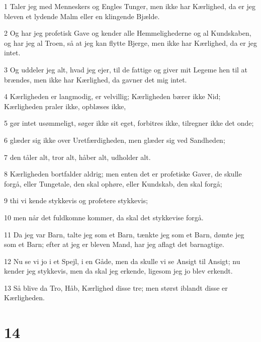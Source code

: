 \par 1 Taler jeg med Menneskers og Engles Tunger, men ikke har Kærlighed, da er jeg bleven et lydende Malm eller en klingende Bjælde.
\par 2 Og har jeg profetisk Gave og kender alle Hemmelighederne og al Kundskaben, og har jeg al Troen, så at jeg kan flytte Bjerge, men ikke har Kærlighed, da er jeg intet.
\par 3 Og uddeler jeg alt, hvad jeg ejer, til de fattige og giver mit Legeme hen til at brændes, men ikke har Kærlighed, da gavner det mig intet.
\par 4 Kærligheden er langmodig, er velvillig; Kærligheden bærer ikke Nid; Kærligheden praler ikke, opblæses ikke,
\par 5 gør intet usømmeligt, søger ikke sit eget, forbitres ikke, tilregner ikke det onde;
\par 6 glæder sig ikke over Uretfærdigheden, men glæder sig ved Sandheden;
\par 7 den tåler alt, tror alt, håber alt, udholder alt.
\par 8 Kærligheden bortfalder aldrig; men enten det er profetiske Gaver, de skulle forgå, eller Tungetale, den skal ophøre, eller Kundskab, den skal forgå;
\par 9 thi vi kende stykkevis og profetere stykkevis;
\par 10 men når det fuldkomne kommer, da skal det stykkevise forgå.
\par 11 Da jeg var Barn, talte jeg som et Barn, tænkte jeg som et Barn, dømte jeg som et Barn; efter at jeg er bleven Mand, har jeg aflagt det barnagtige.
\par 12 Nu se vi jo i et Spejl, i en Gåde, men da skulle vi se Ansigt til Ansigt; nu kender jeg stykkevis, men da skal jeg erkende, ligesom jeg jo blev erkendt.
\par 13 Så blive da Tro, Håb, Kærlighed disse tre; men størst iblandt disse er Kærligheden.

\chapter{14}

